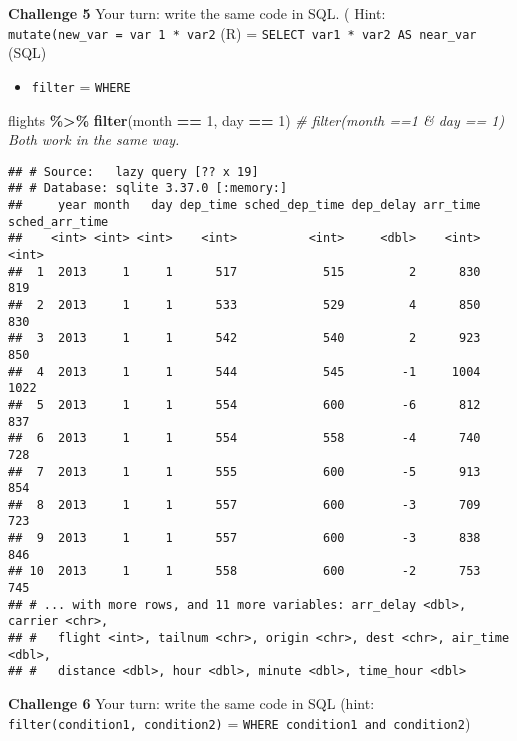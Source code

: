 \documentclass[
]{book}
\newenvironment{Shaded}{\begin{snugshade}}{\end{snugshade}}
\newcommand{\CommentTok}[1]{\textcolor[rgb]{0.56,0.35,0.01}{\textit{#1}}}
\newcommand{\DecValTok}[1]{\textcolor[rgb]{0.00,0.00,0.81}{#1}}
\newcommand{\KeywordTok}[1]{\textcolor[rgb]{0.13,0.29,0.53}{\textbf{#1}}}
\newcommand{\NormalTok}[1]{#1}
\newcommand{\OperatorTok}[1]{\textcolor[rgb]{0.81,0.36,0.00}{\textbf{#1}}}
\newcommand{\StringTok}[1]{\textcolor[rgb]{0.31,0.60,0.02}{#1}}
\providecommand{\tightlist}{%
  \setlength{\itemsep}{0pt}\setlength{\parskip}{0pt}}
\begin{document}
\textbf{Challenge 5}
Your turn: write the same code in SQL. (
Hint: \texttt{mutate(new\_var\ =\ var\ 1\ *\ var2} (R) = \texttt{SELECT\ var1\ *\ var2\ AS\ near\_var} (SQL)

\begin{itemize}
\tightlist
\item
  \texttt{filter} = \texttt{WHERE}
\end{itemize}

\begin{Shaded}
\begin{Highlighting}[]
\NormalTok{flights }\OperatorTok{\%\textgreater{}\%}\StringTok{ }
\StringTok{  }\KeywordTok{filter}\NormalTok{(month }\OperatorTok{==}\StringTok{ }\DecValTok{1}\NormalTok{, day }\OperatorTok{==}\StringTok{ }\DecValTok{1}\NormalTok{) }\CommentTok{\# filter(month ==1 \& day == 1) Both work in the same way.}
\end{Highlighting}
\end{Shaded}

\begin{verbatim}
## # Source:   lazy query [?? x 19]
## # Database: sqlite 3.37.0 [:memory:]
##     year month   day dep_time sched_dep_time dep_delay arr_time sched_arr_time
##    <int> <int> <int>    <int>          <int>     <dbl>    <int>          <int>
##  1  2013     1     1      517            515         2      830            819
##  2  2013     1     1      533            529         4      850            830
##  3  2013     1     1      542            540         2      923            850
##  4  2013     1     1      544            545        -1     1004           1022
##  5  2013     1     1      554            600        -6      812            837
##  6  2013     1     1      554            558        -4      740            728
##  7  2013     1     1      555            600        -5      913            854
##  8  2013     1     1      557            600        -3      709            723
##  9  2013     1     1      557            600        -3      838            846
## 10  2013     1     1      558            600        -2      753            745
## # ... with more rows, and 11 more variables: arr_delay <dbl>, carrier <chr>,
## #   flight <int>, tailnum <chr>, origin <chr>, dest <chr>, air_time <dbl>,
## #   distance <dbl>, hour <dbl>, minute <dbl>, time_hour <dbl>
\end{verbatim}

\textbf{Challenge 6}
Your turn: write the same code in SQL (hint: \texttt{filter(condition1,\ condition2)} = \texttt{WHERE\ condition1\ and\ condition2})
\end{document}
